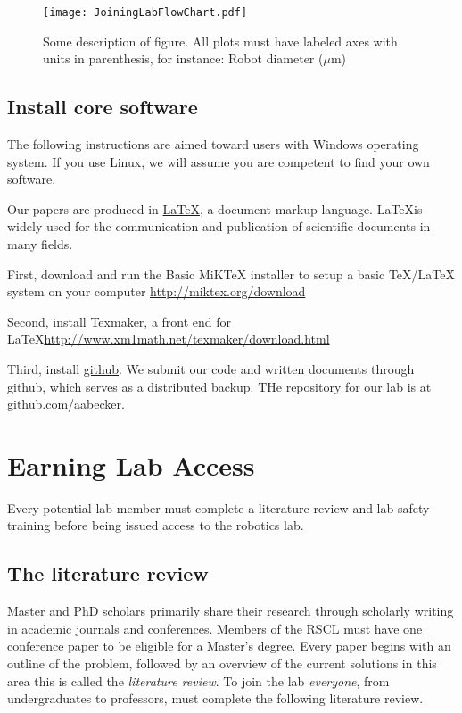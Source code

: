 \documentclass[letterpaper, 10 pt, conference]{ieeeconf}
\begin{document}
\begin{figure}[h]
\begin{center}
\texttt{[image: JoiningLabFlowChart.pdf]}
\caption{Some description of figure.  All plots must have labeled axes with units in parenthesis, for instance:  Robot diameter ($\mu$m)
\label{fig:flowchart}}
\end{center}
\end{figure}

\subsection{Install core software}
The following instructions are aimed toward users with Windows operating system. If you use Linux, we will assume you are competent to find your own software.

Our papers are produced in \href{http://en.wikipedia.org/wiki/LaTeX}{\LaTeX}, a document markup language. \LaTeX is widely used for the communication and publication of scientific documents in many fields.

First, download and run the Basic MiKTeX installer to setup a basic TeX/LaTeX system on your computer \url{http://miktex.org/download}

Second, install Texmaker, a front end for \LaTeX \url{http://www.xm1math.net/texmaker/download.html}

Third, install \href{https://github.com/}{github}. We submit our code and written documents through github, which serves as a distributed backup. THe  repository for our lab is at  \href{https://github.com/aabecker}{github.com/aabecker}.





 
\section{Earning Lab Access}
Every potential lab member must complete a literature review and lab safety training before being issued access to the robotics lab.

\subsection{The literature review}
Master and PhD scholars primarily share their research through scholarly writing in academic journals and conferences. Members of the RSCL must have one conference paper to be eligible for a Master's degree. Every paper begins with an outline of the problem, followed by an overview of the current solutions in this area this is called the \emph{literature review}. To join the lab \emph{everyone}, from undergraduates to professors, must complete the following literature review.
\end{document}
